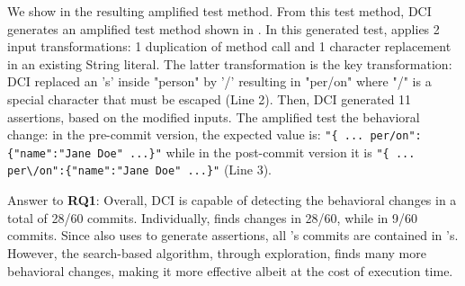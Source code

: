 We show in  
the resulting amplified test method.
From this test method, DCI generates an amplified test method shown in . 
In this generated test, \sbampl applies 2 input transformations: 1 duplication of method call and 1 character replacement in an existing String literal.
The latter transformation is the key transformation: DCI replaced an 's' inside "person" by '/' resulting in "per/on" where "/" is a special character that must be escaped (Line 2). 
Then, DCI generated 11 assertions, based on the modified inputs. 
The amplified test the behavioral change:
in the pre-commit version, the expected value is: \texttt{"\{ ... per/on":\{"name":"Jane Doe" ...\}"} while in the post-commit version it is \texttt{"\{ ... per\textbackslash/on":\{"name":"Jane Doe" ...\}"} (Line 3).
 
\begin{mdframed}
Answer to \textbf{RQ1}: Overall, DCI is capable of detecting the behavioral changes in a total of 28/60 commits. Individually, \DCII finds changes in 28/60, while \DCIA in 9/60 commits.
Since \DCII also uses \aampl to generate assertions, all \DCIA's commits are contained in \DCII's. However, the search-based algorithm, through exploration, finds many more behavioral changes, making it more effective albeit at the cost of execution time.
\end{mdframed}


\subsubsection{\rqiteration}
\label{subsubsec:answerqiteration}

 

